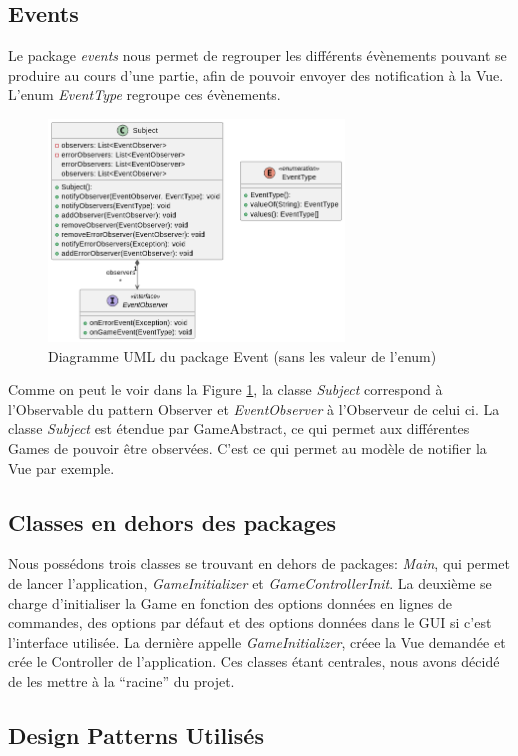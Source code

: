 \documentclass{article}
\begin{document}
\subsection{Events}
Le package \textit{events} nous permet de regrouper les différents évènements pouvant se produire au cours d'une partie, afin de pouvoir envoyer des notification à la Vue.
L'enum \textit{EventType} regroupe ces évènements.
\begin{figure}[h]
    \centering
    \includegraphics[width=0.7\textwidth]{uml_event}
    \caption{Diagramme UML du package Event (sans les valeur de l'enum)}
    \label{umlEvents}
\end{figure}
\FloatBarrier
Comme on peut le voir dans la Figure \ref{umlEvents}, la classe \textit{Subject} correspond à l'Observable du pattern Observer et \textit{EventObserver} à l'Observeur de celui ci.
La classe \textit{Subject} est étendue par GameAbstract, ce qui permet aux différentes Games de pouvoir être observées. C'est ce qui permet au modèle de notifier la Vue par exemple.

\subsection{Classes en dehors des packages}
Nous possédons trois classes se trouvant en dehors de packages: \textit{Main}, qui permet de lancer l'application, 
\textit{GameInitializer} et \textit{GameControllerInit}. La deuxième se charge d'initialiser la Game en fonction des options données en lignes de commandes, des options par défaut
et des options données dans le GUI si c'est l'interface utilisée. La dernière appelle \textit{GameInitializer}, créee la Vue demandée et crée le Controller de l'application.
Ces classes étant centrales, nous avons décidé de les mettre à la ``racine'' du projet.
\subsection{Design Patterns Utilisés}
\end{document}
